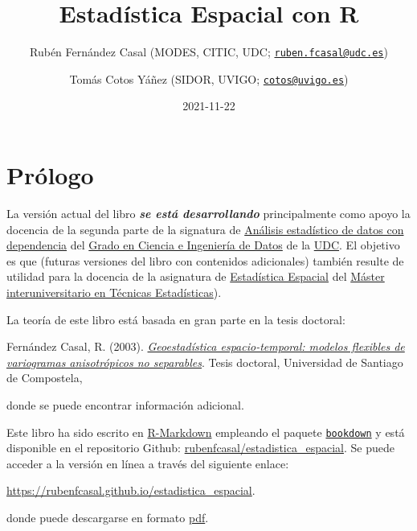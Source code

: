 \documentclass[
  spanish,
]{book}
\title{Estadística Espacial con R}
\author{Rubén Fernández Casal (MODES, CITIC, UDC; \href{mailto:ruben.fcasal@udc.es}{\nolinkurl{ruben.fcasal@udc.es}}) \and Tomás Cotos Yáñez (SIDOR, UVIGO; \href{mailto:cotos@uvigo.es}{\nolinkurl{cotos@uvigo.es}})}
\date{2021-11-22}
\theoremstyle{break}
\begin{document}
\maketitle

{
\setcounter{tocdepth}{1}
\tableofcontents
}
\hypertarget{pruxf3logo}{%
\chapter*{Prólogo}\label{pruxf3logo}}

La versión actual del libro \textbf{\emph{se está desarrollando}} principalmente como apoyo la docencia de la segunda parte de la signatura de \href{https://guiadocente.udc.es/guia_docent/index.php?centre=614\&ensenyament=614G02\&assignatura=614G02022\&idioma=cast}{Análisis estadístico de datos con dependencia} del \href{https://estudos.udc.es/es/study/start/614G02V01}{Grado en Ciencia e Ingeniería de Datos} de la \href{https://www.udc.es}{UDC}.
El objetivo es que (futuras versiones del libro con contenidos adicionales) también resulte de utilidad para la docencia de la asignatura de \href{http://eamo.usc.es/pub/mte/index.php?option=com_content\&view=article\&id=2202\&idm=15\&a\%C3\%B1o=2021}{Estadística Espacial} del \href{http://eio.usc.es/pub/mte}{Máster interuniversitario en Técnicas Estadísticas}).

La teoría de este libro está basada en gran parte en la tesis doctoral:

Fernández Casal, R. (2003). \href{https://rubenfcasal.github.io/files/Geoestadistica_espacio-temporal.pdf}{\emph{Geoestadística espacio-temporal: modelos flexibles de variogramas anisotrópicos no separables}}. Tesis doctoral, Universidad de Santiago de Compostela,

donde se puede encontrar información adicional.

Este libro ha sido escrito en \href{http://rmarkdown.rstudio.com}{R-Markdown} empleando el paquete \href{https://bookdown.org/yihui/bookdown/}{\texttt{bookdown}} y está disponible en el repositorio Github: \href{https://github.com/rubenfcasal/estadistica_espacial}{rubenfcasal/estadistica\_espacial}.
Se puede acceder a la versión en línea a través del siguiente enlace:

\url{https://rubenfcasal.github.io/estadistica_espacial}.

donde puede descargarse en formato \href{https://rubenfcasal.github.io/estadistica_espacial/estadistica_espacial.pdf}{pdf}.
\end{document}
